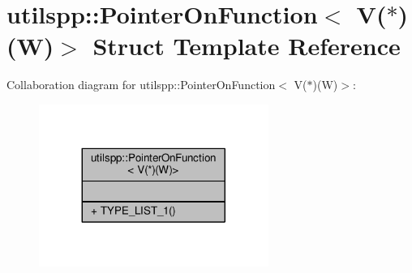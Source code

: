 \hypertarget{structutilspp_1_1PointerOnFunction_3_01V_07_5_08_07W_08_4}{\section{utilspp\-:\-:Pointer\-On\-Function$<$ V($\ast$)(W)$>$ Struct Template Reference}
\label{structutilspp_1_1PointerOnFunction_3_01V_07_5_08_07W_08_4}
}


Collaboration diagram for utilspp\-:\-:Pointer\-On\-Function$<$ V($\ast$)(W)$>$\-:\nopagebreak
\begin{figure}[H]
\begin{center}
\leavevmode
\includegraphics[width=212pt]{structutilspp_1_1PointerOnFunction_3_01V_07_5_08_07W_08_4__coll__graph}
\end{center}
\end{figure}
